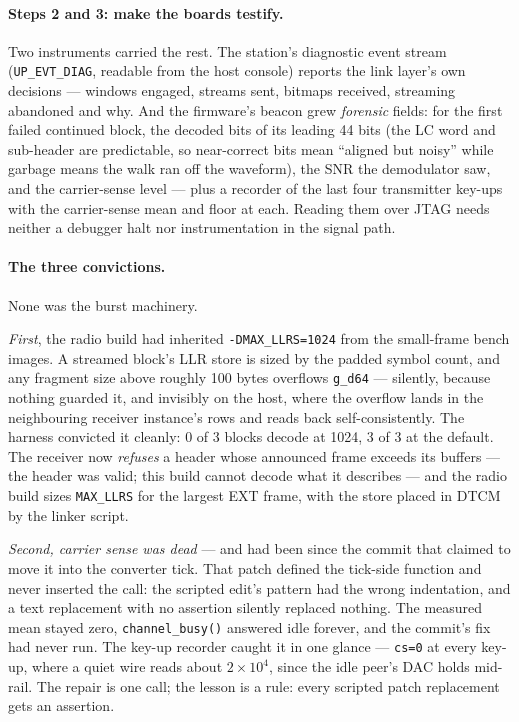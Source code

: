 \paragraph{Steps 2 and 3: make the boards testify.} Two instruments
carried the rest. The station's diagnostic event stream
(\texttt{UP\_EVT\_DIAG}, readable from the host console) reports the
link layer's own decisions --- windows engaged, streams sent, bitmaps
received, streaming abandoned and why. And the firmware's beacon grew
\emph{forensic} fields: for the first failed continued block, the
decoded bits of its leading 44 bits (the LC word and sub-header are
predictable, so near-correct bits mean ``aligned but noisy'' while
garbage means the walk ran off the waveform), the SNR the demodulator
saw, and the carrier-sense level --- plus a recorder of the last four
transmitter key-ups with the carrier-sense mean and floor at each.
Reading them over JTAG needs neither a debugger halt nor
instrumentation in the signal path.

\paragraph{The three convictions.} None was the burst machinery.

\emph{First}, the radio build had inherited \texttt{-DMAX\_LLRS=1024}
from the small-frame bench images. A streamed block's LLR store is
sized by the padded symbol count, and any fragment size above roughly
100 bytes overflows \texttt{g\_d64} --- silently, because nothing
guarded it, and invisibly on the host, where the overflow lands in the
neighbouring receiver instance's rows and reads back self-consistently.
The harness convicted it cleanly: 0 of 3 blocks decode at 1024, 3 of 3
at the default. The receiver now \emph{refuses} a header whose
announced frame exceeds its buffers --- the header was valid; this
build cannot decode what it describes --- and the radio build sizes
\texttt{MAX\_LLRS} for the largest EXT frame, with the store placed in
DTCM by the linker script.

\emph{Second, carrier sense was dead} --- and had been since the commit
that claimed to move it into the converter tick. That patch defined the
tick-side function and never inserted the call: the scripted edit's
pattern had the wrong indentation, and a text replacement with no
assertion silently replaced nothing. The measured mean stayed zero,
\texttt{channel\_busy()} answered idle forever, and the commit's fix
had never run. The key-up recorder caught it in one glance ---
\texttt{cs=0} at every key-up, where a quiet wire reads about
$2\times10^4$, since the idle peer's DAC holds mid-rail. The repair is
one call; the lesson is a rule: every scripted patch replacement gets
an assertion.

